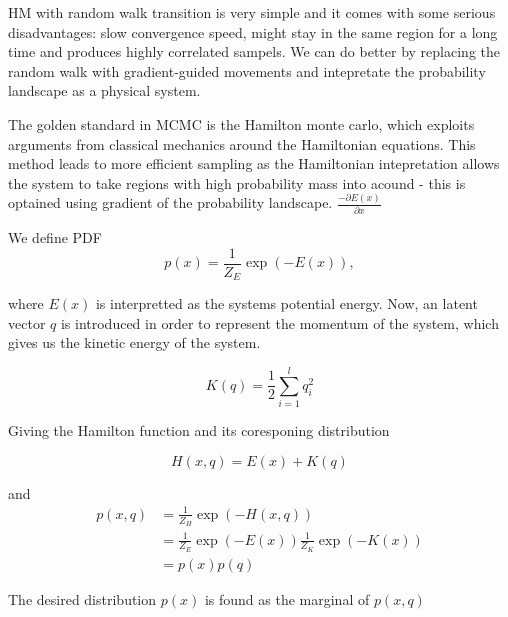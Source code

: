 






HM with random walk transition is very simple and it comes with some serious disadvantages:
slow convergence speed, might stay in the same region for a long time and produces highly correlated sampels. 
We can do better by replacing the random walk with gradient-guided movements and intepretate the probability
landscape as a physical system.


\begin{testexample}[HMC]
The golden standard in MCMC is the Hamilton monte carlo, which exploits arguments from classical mechanics
around the Hamiltonian equations. This method leads to more efficient sampling as the Hamiltonian intepretation allows the system
to take regions with high probability mass into acound - this is optained using gradient
of the probability landscape.  $\frac{-\partial E(x)}{\partial x} $
 
We define PDF
$$p(x) = \frac{1}{Z_E}\exp(-E(x)),$$

where $E(x)$ is interpretted as the systems potential energy. Now, an latent vector $q$ is introduced in order
to represent the momentum of the system, which gives us the kinetic energy of the system. 

$$K(q) = \frac{1}{2}\sum_{i=1}^l q_i^2$$

Giving the Hamilton function and its coresponing distribution

$$H(x,q)= E(x)+K(q)$$

and 
\begin{align}
    p(x,q) &= \frac{1}{Z_H} \exp(-H(x,q))\\
    &= \frac{1}{Z_E} \exp(-E(x))\frac{1}{Z_K} \exp(-K(x))\\
    &= p(x)p(q)
\end{align}

The desired distribution $p(x)$ is found as the marginal of $p(x,q)$

\end{testexample}

